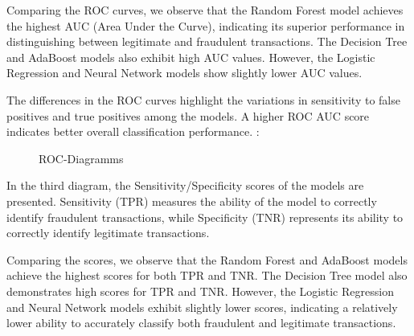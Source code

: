 \documentclass[a4, 10 pt, conference]{ieeeconf}  %
\begin{document}
{\begin{itemize}
Comparing the ROC curves, we observe that the Random Forest model achieves the highest AUC (Area Under the Curve), indicating its superior performance in distinguishing between legitimate and fraudulent transactions. The Decision Tree and AdaBoost models also exhibit high AUC values. However, the Logistic Regression and Neural Network models show slightly lower AUC values.

The differences in the ROC curves highlight the variations in sensitivity to false positives and true positives among the models. A higher ROC AUC score indicates better overall classification performance. :
\end{itemize}


  
 
\begin{figure}[h]
\centering
  \caption{ROC-Diagramms} 
  \end{figure}
  \begin{itemize}
  \textbfIn In the third diagram, the Sensitivity/Specificity scores of the models are presented. Sensitivity (TPR) measures the ability of the model to correctly identify fraudulent transactions, while Specificity (TNR) represents its ability to correctly identify legitimate transactions.

Comparing the scores, we observe that the Random Forest and AdaBoost models achieve the highest scores for both TPR and TNR. The Decision Tree model also demonstrates high scores for TPR and TNR. However, the Logistic Regression and Neural Network models exhibit slightly lower scores, indicating a relatively lower ability to accurately classify both fraudulent and legitimate transactions.


\end{itemize}}
\end{document}
